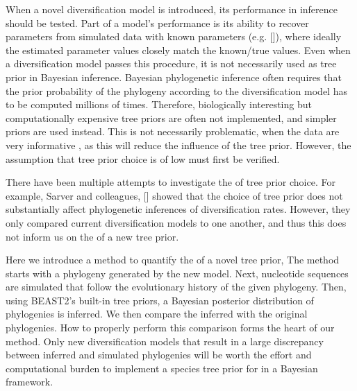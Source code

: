 When a novel diversification model is introduced,
its performance in inference should be tested.
Part of a model's performance is its ability to 
recover parameters from simulated data with known 
parameters (e.g. [\cite{etienne2014estimating}]), 
where ideally the estimated parameter values closely match the known/true values.
Even when a diversification model passes this procedure, 
it is not necessarily used as tree prior in Bayesian inference.
Bayesian phylogenetic inference often requires 
that the prior probability of the phylogeny 
according to the diversification model has to be computed millions of times. 
Therefore, biologically interesting but computationally expensive tree priors 
are often not implemented, and simpler priors are used instead. 
This is not necessarily problematic, when the data are very informative 
, 
as this will reduce the influence of the tree prior.
However, the assumption that tree prior choice is of low  
must first be verified.

There have been multiple attempts to investigate the  of tree
prior choice. For example, Sarver and colleagues, [\cite{sarver2019choice}] 
showed that the choice of tree prior does not 
substantially affect phylogenetic inferences of diversification rates.
However, they only compared current diversification models to one another, 
and thus this does not inform us on the  of a new tree prior.


Here we introduce a method to quantify the  
of a novel tree prior,
The method starts with a phylogeny generated by the new model. 
Next, nucleotide sequences are simulated that follow the evolutionary 
history of the given phylogeny. 
Then, using BEAST2's built-in tree priors,
a Bayesian posterior distribution of phylogenies is inferred. 
We then compare the inferred with the original phylogenies. 
How to properly perform this comparison forms the heart of our method.
Only new diversification models that result 
in a large discrepancy between inferred and simulated phylogenies 
will be worth the effort and computational burden to implement 
a species tree prior for in a Bayesian framework.

